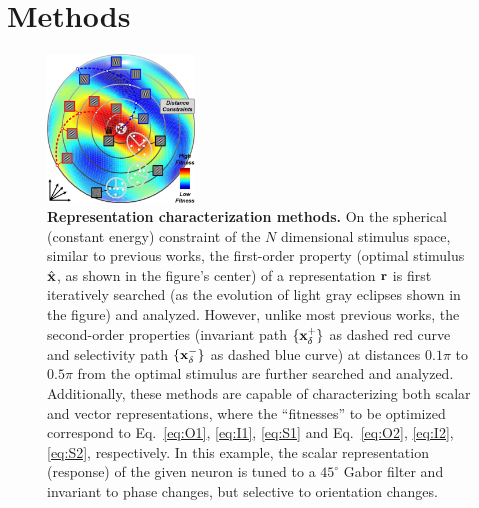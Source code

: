 \documentclass[10pt,twocolumn,letterpaper]{article}
\begin{document}


\section{Methods}

\begin{figure}
\begin{center}
\includegraphics[width=0.35\textwidth]{Figs/methods.pdf} 
\end{center}
\caption{{\bf Representation characterization methods.}
On the spherical (\ie constant energy) constraint of the $N$ dimensional stimulus space, similar to previous works, the first-order property (\ie optimal stimulus $\hat{\bf{x}}$, as shown in the figure's center) of a representation $\bf{r}$ is first iteratively searched (as the evolution of light gray eclipses shown in the figure) and analyzed.
However, unlike most previous works, the second-order properties (\ie invariant path $\lbrace \bf{x}^{+}_{\delta} \rbrace$ as dashed red curve and selectivity path $\lbrace \bf{x}^{-}_{\delta} \rbrace$ as dashed blue curve) at distances $0.1\pi$ to $0.5\pi$ from the optimal stimulus are further searched and analyzed.
Additionally, these methods are capable of characterizing both scalar and vector representations, where the ``fitnesses'' to be optimized correspond to Eq.~\ref{eq:O1}, \ref{eq:I1}, \ref{eq:S1} and Eq.~\ref{eq:O2}, \ref{eq:I2}, \ref{eq:S2}, respectively.
In this example, the scalar representation (\ie response) of the given neuron is tuned to a $45^{\circ}$ Gabor filter and invariant to phase changes, but selective to orientation changes.
}
\label{fig:methods}
\end{figure}
\end{document}
